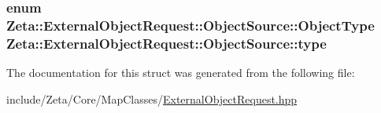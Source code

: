 \hypertarget{structZeta_1_1ExternalObjectRequest_1_1ObjectSource_ab89fa828c4b926fb79e40fcf706daf60}{
\subsubsection[{type}]{\setlength{\rightskip}{0pt plus 5cm}enum {\bf Zeta\+::\+External\+Object\+Request\+::\+Object\+Source\+::\+Object\+Type}  Zeta\+::\+External\+Object\+Request\+::\+Object\+Source\+::type}}\label{structZeta_1_1ExternalObjectRequest_1_1ObjectSource_ab89fa828c4b926fb79e40fcf706daf60}


The documentation for this struct was generated from the following file\+:\begin{DoxyCompactItemize}
\item 
include/\+Zeta/\+Core/\+Map\+Classes/\hyperlink{ExternalObjectRequest_8hpp}{External\+Object\+Request.\+hpp}\end{DoxyCompactItemize}
